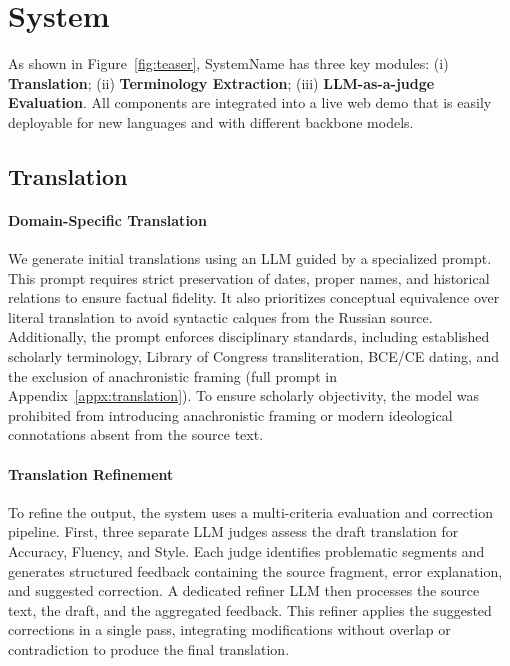 \documentclass[11pt]{article}
\newcommand{\systemname}{SystemName}
\newcommand{\moduleTranslation}{Translation}
\newcommand{\moduleTerminology}{Terminology Extraction}
\newcommand{\moduleEvaluation}{LLM-as-a-judge Evaluation}
\begin{document}










\section{System}
As shown in Figure~\ref{fig:teaser}, \systemname{} has three key modules: (i) \textbf{\moduleTranslation}; (ii) \textbf{\moduleTerminology}; (iii) \textbf{\moduleEvaluation}. All components are integrated into a live web demo that is easily deployable for new languages and with different backbone models.


\subsection{\moduleTranslation}
\paragraph{Domain-Specific Translation}
We generate initial translations using an LLM guided by a specialized prompt. This prompt requires strict preservation of dates, proper names, and historical relations to ensure factual fidelity. It also prioritizes conceptual equivalence over literal translation to avoid syntactic calques from the Russian source. Additionally, the prompt enforces disciplinary standards, including established scholarly terminology, Library of Congress transliteration, BCE/CE dating, and the exclusion of anachronistic framing (full prompt in Appendix~\ref{appx:translation}). To ensure scholarly objectivity, the model was prohibited from introducing anachronistic framing or modern ideological connotations absent from the source text.

\paragraph{Translation Refinement}
To refine the output, the system uses a multi-criteria evaluation and correction pipeline. First, three separate LLM judges assess the draft translation for Accuracy, Fluency, and Style. Each judge identifies problematic segments and generates structured feedback containing the source fragment, error explanation, and suggested correction. A dedicated refiner LLM then processes the source text, the draft, and the aggregated feedback. This refiner applies the suggested corrections in a single pass, integrating modifications without overlap or contradiction to produce the final translation.
\end{document}
